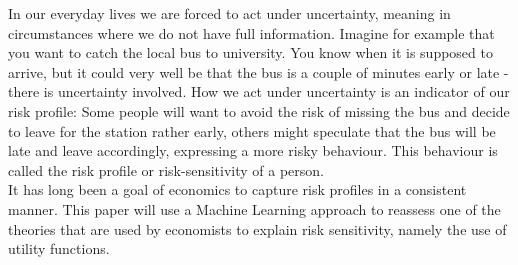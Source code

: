 In our everyday lives we are forced to act under uncertainty, meaning in circumstances where we do not have full information. Imagine for example that you want to catch the local bus to university. You know when it is supposed to arrive, but it could very well be that the bus is a couple of minutes early or late - there is uncertainty involved. How we act under uncertainty is an indicator of our risk profile: Some people will want to avoid the risk of missing the bus and decide to leave for the station rather early, others might speculate that the bus will be late and leave accordingly, expressing a more risky behaviour. This behaviour is called the risk profile or risk-sensitivity of a person.\\
It has long been a goal of economics to capture risk profiles in a consistent manner. This paper will use a Machine Learning approach to reassess one of the theories that are used by economists to explain risk sensitivity, namely the use of utility functions.
